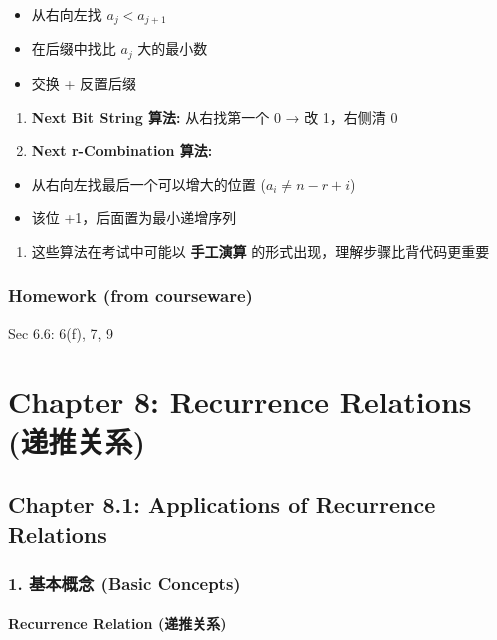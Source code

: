 \documentclass[10pt,a4paper,openany]{ctexbook}
\theoremstyle{definition}
\theoremstyle{remark}
\begin{document}
\begin{itemize}
\item 从右向左找 $a_j < a_{j+1}$
\item 在后缀中找比 $a_j$ 大的最小数
\item 交换 + 反置后缀
\end{itemize}

\begin{enumerate}
\item \textbf{Next Bit String 算法:} 从右找第一个 0 → 改 1，右侧清 0
\item \textbf{Next r-Combination 算法:}
\end{enumerate}

\begin{itemize}
\item 从右向左找最后一个可以增大的位置 ($a_i \neq n-r+i$)
\item 该位 +1，后面置为最小递增序列
\end{itemize}

\begin{enumerate}
\item 这些算法在考试中可能以 \textbf{手工演算} 的形式出现，理解步骤比背代码更重要

\end{enumerate}

\vspace{-2pt}

\subsection{Homework (from courseware)}

Sec 6.6: 6(f), 7, 9

\chapter{Chapter 8: Recurrence Relations (递推关系)}

\section{Chapter 8.1: Applications of Recurrence Relations}

\subsection{1. 基本概念 (Basic Concepts)}

\subsubsection{Recurrence Relation (递推关系)}
\end{document}
